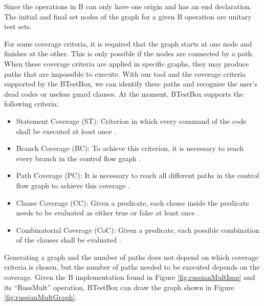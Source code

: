 \documentclass[runningheads]{llncs}
\begin{document}

Since the operations in B can only have one origin and has an end declaration. The initial and final set nodes of the graph for a given B operation are unitary test sets.

For some coverage criteria, it is required that the graph starts at one node and finishes at the other. This is only possible if the nodes are connected by a path. When these coverage criteria are applied in specific graphs, they may produce paths that are impossible to execute. With our tool and the coverage criteria supported by the BTestBox, we can identify these paths and recognise the user's dead codes or useless guard clauses. At the moment, BTestBox supports the following criteria:

\begin{itemize}
    \item Statement Coverage (ST): Criterion in which every command of the code shall be executed at least once \cite{ammann2008introduction}.
    \item Branch Coverage (BC): To achieve this criterion, it is necessary to reach every branch in the control flow graph \cite{ammann2008introduction}.
    \item Path Coverage (PC): It is necessary to reach all different paths in the control flow graph to achieve this coverage \cite{ammann2008introduction}.
    \item Clause Coverage (CC): Given a predicate, each clause inside the predicate needs to be evaluated as either true or false at least once \cite{ammann2003coverage}.
    \item Combinatorial Coverage (CoC): Given a predicate, each possible combination of the clauses shall be evaluated \cite{ammann2003coverage}.
\end{itemize}

Generating a graph and the number of paths does not depend on which coverage criteria is chosen, but the number of paths needed to be executed depends on the coverage. Given the B implementation found in Figure \ref{fig:russianMultImp} and its ``RussMult'' operation, BTestBox can draw the graph shown in Figure \ref{fig:russianMultGraph}.

        
\end{document}
